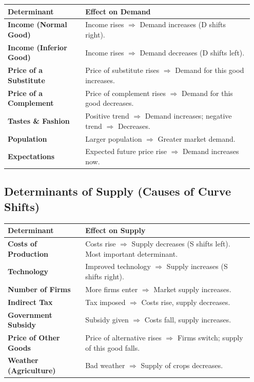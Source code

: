 \documentclass[11pt, a4paper, twoside]{book}
\begin{document}
\begin{tcolorbox}[enhanced,colback=LightBlue,colframe=MidBlue!70,arc=0pt,boxrule=0.8pt]
\begin{tabular}{@{}>{\RaggedRight\arraybackslash}p{0.3\linewidth}>{\RaggedRight\arraybackslash}p{0.65\linewidth}@{}}
\textbf{\color{NavyPrimary}Determinant} & \textbf{\color{NavyPrimary}Effect on Demand} \\
\midrule
\textbf{Income (Normal Good)} & Income rises $\Rightarrow$ Demand increases (D shifts right). \\
\textbf{Income (Inferior Good)} & Income rises $\Rightarrow$ Demand decreases (D shifts left). \\
\textbf{Price of a Substitute} & Price of substitute rises $\Rightarrow$ Demand for this good increases. \\
\textbf{Price of a Complement} & Price of complement rises $\Rightarrow$ Demand for this good decreases. \\
\textbf{Tastes \& Fashion} & Positive trend $\Rightarrow$ Demand increases; negative trend $\Rightarrow$ Decreases. \\
\textbf{Population} & Larger population $\Rightarrow$ Greater market demand. \\
\textbf{Expectations} & Expected future price rise $\Rightarrow$ Demand increases now. \\
\end{tabular}
\end{tcolorbox}

\subsection{Determinants of Supply (Causes of Curve Shifts)}

\begin{tcolorbox}[enhanced,colback=LightBlue,colframe=MidBlue!70,arc=0pt,boxrule=0.8pt]
\begin{tabular}{@{}>{\RaggedRight\arraybackslash}p{0.3\linewidth}>{\RaggedRight\arraybackslash}p{0.65\linewidth}@{}}
\textbf{\color{NavyPrimary}Determinant} & \textbf{\color{NavyPrimary}Effect on Supply} \\
\midrule
\textbf{Costs of Production} & Costs rise $\Rightarrow$ Supply decreases (S shifts left). Most important determinant. \\
\textbf{Technology} & Improved technology $\Rightarrow$ Supply increases (S shifts right). \\
\textbf{Number of Firms} & More firms enter $\Rightarrow$ Market supply increases. \\
\textbf{Indirect Tax} & Tax imposed $\Rightarrow$ Costs rise, supply decreases. \\
\textbf{Government Subsidy} & Subsidy given $\Rightarrow$ Costs fall, supply increases. \\
\textbf{Price of Other Goods} & Price of alternative rises $\Rightarrow$ Firms switch; supply of this good falls. \\
\textbf{Weather (Agriculture)} & Bad weather $\Rightarrow$ Supply of crops decreases. \\
\end{tabular}
\end{tcolorbox}
\end{document}
